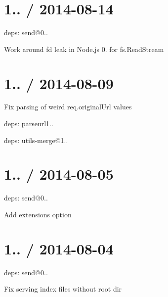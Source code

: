 \section*{1.. / 2014-\/08-\/14 }


\begin{DoxyItemize}
\item deps\+: send@0..
\begin{DoxyItemize}
\item Work around {\ttfamily fd} leak in Node.\+js 0. for {\ttfamily fs.\+Read\+Stream}
\end{DoxyItemize}
\end{DoxyItemize}

\section*{1.. / 2014-\/08-\/09 }


\begin{DoxyItemize}
\item Fix parsing of weird {\ttfamily req.\+original\+Url} values
\item deps\+: parseurl1..
\item deps\+: utils-\/merge@1..
\end{DoxyItemize}

\section*{1.. / 2014-\/08-\/05 }


\begin{DoxyItemize}
\item deps\+: send@0..
\begin{DoxyItemize}
\item Add {\ttfamily extensions} option
\end{DoxyItemize}
\end{DoxyItemize}

\section*{1.. / 2014-\/08-\/04 }


\begin{DoxyItemize}
\item deps\+: send@0..
\begin{DoxyItemize}
\item Fix serving index files without root dir
\end{DoxyItemize}
\end{DoxyItemize}

